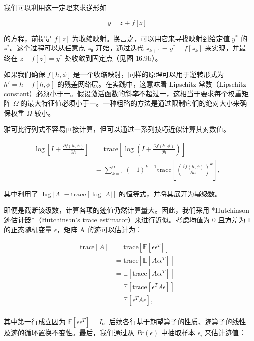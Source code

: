 我们可以利用这一定理来求逆形如

\[
y = z + f[z] \tag{16.21}
\]

的方程，前提是 \(f[z]\) 为收缩映射。换言之，可以用它来寻找映射到给定值 \(y^*\) 的 \(z^*\)。这个过程可以从任意点 \(z_0\) 开始，通过迭代 \(z_{k+1} = y^* - f[z_k]\) 来实现，并最终在 \(z + f[z] = y^*\) 处收敛到固定点（见图 16.9b）。

如果我们确保 \(f[h, \phi]\) 是一个收缩映射，同样的原理可以用于逆转形式为 \(h' = h + f[h, \phi]\) 的残差网络层。在实践中，这意味着 Lipschitz 常数（Lipschitz constant）必须小于一。假设激活函数的斜率不超过一，这相当于要求每个权重矩阵 \(\Omega\) 的最大特征值必须小于一。一种粗略的方法是通过限制它们的绝对大小来确保权重 \(\Omega\) 较小。

雅可比行列式不容易直接计算，但可以通过一系列技巧近似计算其对数值。

\begin{align}
\log \left[ I + \frac{\partial f(h, \phi)}{\partial h} \right] &= \text{trace} \left[ \log \left( I + \frac{\partial f(h, \phi)}{\partial h} \right) \right] \\
&= \sum_{k=1}^{\infty} (-1)^{k-1} \text{trace} \left[ \left( \frac{\partial f(h, \phi)}{\partial h} \right)^k \right],
\end{align} 



其中利用了 \(\log|A| = \text{trace}[\log|A|]\) 的恒等式，并将其展开为幂级数。

即便是截断该级数，计算各项的迹值仍然计算量大。因此，我们采用 *Hutchinson 迹估计器*（Hutchinson's trace estimator）来进行近似。考虑均值为 0 且方差为 I 的正态随机变量 \(\epsilon\)，矩阵 A 的迹可以估计为：

\[
\begin{aligned}
\text{trace}[A] &= \text{trace} [\mathbb{E} [\epsilon \epsilon^T]] \\
&= \text{trace} [\mathbb{E} [A \epsilon \epsilon^T]] \\
&= \mathbb{E} [\text{trace} [A \epsilon \epsilon^T]] \\
&= \mathbb{E} [\text{trace} [\epsilon^T A \epsilon]] \\
&= \mathbb{E} [\epsilon^T A \epsilon], \\
\end{aligned} \tag{16.23}
\]

其中第一行成立因为 \(\mathbb{E}[\epsilon \epsilon^T] = I\)。后续各行基于期望算子的性质、迹算子的线性及迹的循环置换不变性。最后，我们通过从 \(Pr(\epsilon)\) 中抽取样本 \(\epsilon_i\) 来估计迹值：

